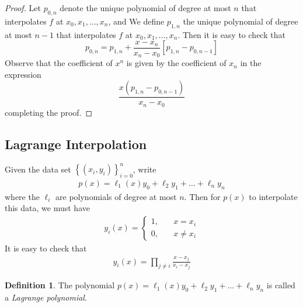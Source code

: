 \documentclass[12pt]{article}
\theoremstyle{plain}
\theoremstyle{definition}
\newtheorem*{definition}{Definition}
\theoremstyle{remark}
\numberwithin{equation}{section}  %
\begin{document}
		\begin{proof}
			Let $p_{0,n}$ denote the unique polynomial of degree at most $n$ that
			interpolates $f$ at $x_0, x_1, \ldots, x_n$, and  We define
			$p_{1,n}$ the unique polynomial of degree at most $n-1$ that interpolates
			$f$ at $x_0, x_1, \ldots, x_n$. Then it is easy to check that
			\begin{equation*}
				p_{0,n} = p_{1,n} + \frac{x - x_n}{x_n - x_0}[p_{1,n} - p_{0,n-1}]
			\end{equation*}
			Observe that the coefficient of $x^n$ is given by the coefficient of $x_n$ in the expression 
			\begin{equation*}
				\frac{x(p_{1,n} - p_{0,n-1})}{x_n - x_0}
			\end{equation*}
			completing the proof.
		\end{proof}
		\subsection{Lagrange Interpolation}
		Given the data set $ \left\{ (x_i, y_i) \right\}_{i=0}^{n}$,
		write
		\begin{align*}
			p(x) = \ell_1(x) y_0 + \ell_2 y_1 + \ldots + \ell_n y_n
		\end{align*}
		where the $\ell_i$ are polynomials of degree at most $n$. 
		Then for $p(x)$ to interpolate this data, we must have
		\begin{align*}
			y_i(x) = \begin{cases}
				1, \quad & x = x_i \\
				0, \quad & x \neq x_i
			\end{cases}
		\end{align*}
		It is easy to check that
		\begin{align*}
			y_i(x) = \prod_{j \neq i} \frac{x - x_j}{x_i - x_j}
		\end{align*}
		\begin{definition}
			The polynomial $p(x) = \ell_1(x) y_0 + \ell_2 y_1 + \ldots + \ell_n y_n$
			is called a \emph{Lagrange polynomial}.
		\end{definition}
\end{document}
